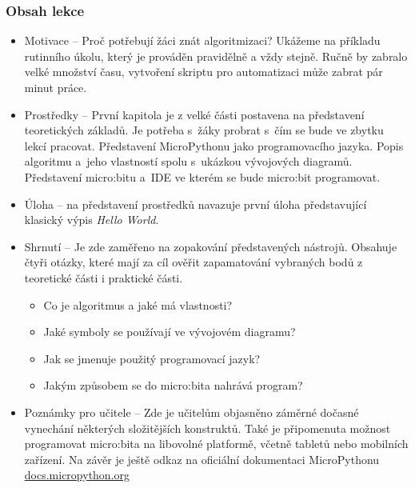 \documentclass[
  digital,     %
  oneside,     %
  nosansbold,  %
  colorbold, %
  lof,         %
  nolot,         %
]{fithesis4}
\begin{document}
\subsubsection{Obsah lekce}
\begin{itemize}
    \item Motivace -- Proč potřebují žáci znát algoritmizaci? Ukážeme na příkladu rutinního úkolu, který je prováděn pravidělně a vždy stejně. Ručně by zabralo velké množství času, vytvoření skriptu pro automatizaci může zabrat pár minut práce.
    \item Prostředky -- První kapitola je z velké části postavena na představení teoretických základů. Je potřeba s~žáky probrat s~čím se bude ve zbytku lekcí pracovat. Představení MicroPythonu jako programovacího jazyka. Popis algoritmu a~jeho vlastností spolu s~ukázkou vývojových diagramů. Představení micro:bitu a~IDE ve kterém se bude micro:bit programovat. 
    \item Úloha -- na představení prostředků navazuje první úloha představující klasický výpis \textit{Hello World}.
    \item Shrnutí -- Je zde zaměřeno na zopakování představených nástrojů. Obsahuje čtyři otázky, které mají za cíl ověřit zapamatování vybraných bodů z teoretické části i praktické části. 
    \begin{itemize}
        \item Co je algoritmus a jaké má vlastnosti?
        \item Jaké symboly se používají ve vývojovém diagramu?
        \item Jak se jmenuje použitý programovací jazyk?
        \item Jakým způsobem se do micro:bita nahrává program?
    \end{itemize}
    \item Poznámky pro učitele -- Zde je učitelům objasněno záměrné dočasné vynechání některých složitějších konstruktů. Také je připomenuta možnost programovat micro:bita na libovolné platformě, včetně tabletů nebo mobilních zařízení. Na závěr je ještě odkaz na oficiální dokumentaci MicroPythonu \href{https://docs.micropython.org/en/latest/}{docs.micropython.org}
\end{itemize}
\end{document}
